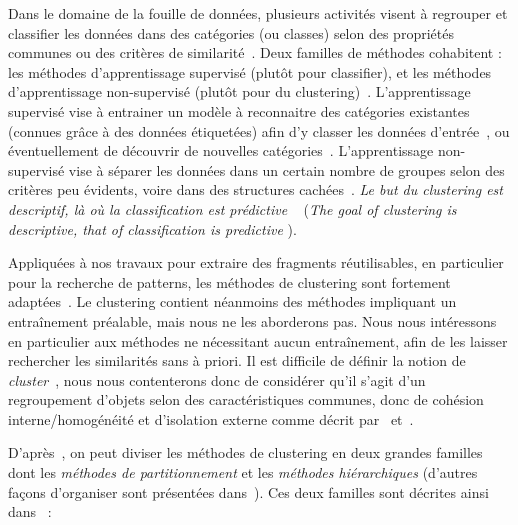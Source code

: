 Dans le domaine de la fouille de données, plusieurs activités visent à regrouper et classifier les données dans des catégories (ou classes) selon des propriétés communes ou des critères de similarité~\cite{xu2008clustering}.
Deux familles de méthodes cohabitent : les méthodes d'apprentissage supervisé (plutôt pour classifier), et les méthodes d'apprentissage non-supervisé (plutôt pour du clustering)~\cite{rokach2005clustering}.
L'apprentissage supervisé vise à entrainer un modèle à reconnaitre des catégories existantes (connues grâce à des données étiquetées) afin d'y classer les données d'entrée~\cite{xu2008clustering}, ou éventuellement de découvrir de nouvelles catégories~\cite{jain1999data}.
L'apprentissage non-supervisé vise à séparer les données dans un certain nombre de groupes selon des critères peu évidents, voire dans des structures cachées~\cite{xu2008clustering}.
\og \textit{Le but du clustering est descriptif, là où la classification est prédictive} \fg~\cite{rokach2005clustering}\cite{veyssieres1998identification} (\og \textit{The goal of clustering is descriptive, that of classification is predictive} \fg).

\bigskip

Appliquées à nos travaux pour extraire des fragments réutilisables, en particulier pour la recherche de patterns, les méthodes de clustering sont fortement adaptées~\cite{jain1999data}.
Le clustering contient néanmoins des méthodes impliquant un entraînement préalable, mais nous ne les aborderons pas.
Nous nous intéressons en particulier aux méthodes ne nécessitant aucun entraînement, afin de les laisser rechercher les similarités sans à priori.
Il est difficile de définir la notion de \textit{cluster}~\cite{estivill2000fast}\cite{everitt2011cluster}, nous nous contenterons donc de considérer qu'il s'agit d'un regroupement d'objets selon des caractéristiques communes, donc de cohésion interne/homogénéité et d'isolation externe comme décrit par~\cite{cormack1971review} et~\cite{gordon1999classification}.

\bigskip

D'après~\cite{fraley1998many}, on peut diviser les méthodes de clustering en deux grandes familles dont les \textit{méthodes de partitionnement} et les \textit{méthodes hiérarchiques} (d'autres façons d'organiser sont présentées dans~\cite{rokach2005clustering}).
Ces deux familles sont décrites ainsi dans~\cite{rokach2005clustering} :

